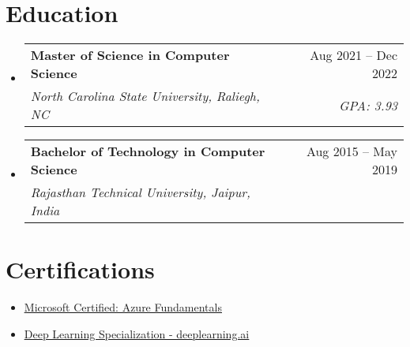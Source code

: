 \documentclass[a4paper,10pt]{article}
\makeatletter
\newcommand{\resumeItem}[1]{
  \item\small{#1}
}
\newcommand{\resumeItemListStart}{\begin{itemize}[rightmargin=0.11in]}
\newcommand{\resumeItemListEnd}{\end{itemize}}
\newcommand{\resumeQuadHeading}[4]{
  \item
  \begin{tabular*}{0.96\textwidth}[t]{l@{\extracolsep{\fill}}r}
    \textbf{#1} & #2 \\
    \textit{\small#3} & \textit{\small #4} \\
  \end{tabular*}
}
\newcommand{\resumeHeadingListStart}{
  \begin{itemize}[leftmargin=0.15in, label={}]
}
\newcommand{\resumeHeadingListEnd}{\end{itemize}}
\makeatother
\begin{document}
\section{Education}
  \resumeHeadingListStart{}
    \resumeQuadHeading{Master of Science in Computer Science}{Aug 2021 -- Dec 2022}
    {North Carolina State University, Raliegh, NC}{GPA: 3.93}

    \resumeQuadHeading{Bachelor of Technology in Computer Science}{Aug 2015 -- May 2019}
    {Rajasthan Technical University, Jaipur, India}{}
  \resumeHeadingListEnd{}

\vspace{-0.8\baselineskip}



\section{Certifications}
  \resumeItemListStart{}
    \resumeItem{\href{https://www.credly.com/badges/d3401e8a-2286-4dec-ac9c-c0144dca670b/public_url}{\uline{Microsoft Certified: Azure Fundamentals}}}
    \resumeItem{\href{https://www.coursera.org/account/accomplishments/verify/HEEDDVMWJ4LB}{\uline{Deep Learning Specialization - deeplearning.ai}}}
  \resumeItemListEnd{}
\end{document}
